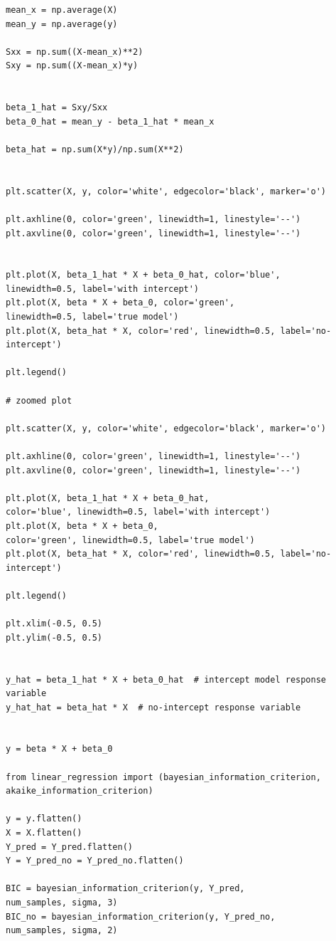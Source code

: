 \documentclass[12pt,a4paper,oneside]{book} %
\begin{document}
\begin{mdframed}[linecolor=black, topline=true, bottomline=true,
	leftline=false, rightline=false, backgroundcolor=yellow!20!white]
	\begin{verbatim}
mean_x = np.average(X)
mean_y = np.average(y)

Sxx = np.sum((X-mean_x)**2)
Sxy = np.sum((X-mean_x)*y)


beta_1_hat = Sxy/Sxx
beta_0_hat = mean_y - beta_1_hat * mean_x

beta_hat = np.sum(X*y)/np.sum(X**2) 


plt.scatter(X, y, color='white', edgecolor='black', marker='o')

plt.axhline(0, color='green', linewidth=1, linestyle='--')
plt.axvline(0, color='green', linewidth=1, linestyle='--')


plt.plot(X, beta_1_hat * X + beta_0_hat, color='blue', 
linewidth=0.5, label='with intercept')
plt.plot(X, beta * X + beta_0, color='green',
linewidth=0.5, label='true model')
plt.plot(X, beta_hat * X, color='red', linewidth=0.5, label='no-intercept')

plt.legend()

# zoomed plot

plt.scatter(X, y, color='white', edgecolor='black', marker='o')

plt.axhline(0, color='green', linewidth=1, linestyle='--')
plt.axvline(0, color='green', linewidth=1, linestyle='--')

plt.plot(X, beta_1_hat * X + beta_0_hat,
color='blue', linewidth=0.5, label='with intercept')
plt.plot(X, beta * X + beta_0,
color='green', linewidth=0.5, label='true model')
plt.plot(X, beta_hat * X, color='red', linewidth=0.5, label='no-intercept')

plt.legend()

plt.xlim(-0.5, 0.5) 
plt.ylim(-0.5, 0.5)  


y_hat = beta_1_hat * X + beta_0_hat  # intercept model response variable
y_hat_hat = beta_hat * X  # no-intercept response variable


y = beta * X + beta_0

from linear_regression import (bayesian_information_criterion,
akaike_information_criterion)

y = y.flatten()
X = X.flatten()
Y_pred = Y_pred.flatten()
Y = Y_pred_no = Y_pred_no.flatten()

BIC = bayesian_information_criterion(y, Y_pred, 
num_samples, sigma, 3)
BIC_no = bayesian_information_criterion(y, Y_pred_no, 
num_samples, sigma, 2)


\end{verbatim}
\end{mdframed}
\end{document}
